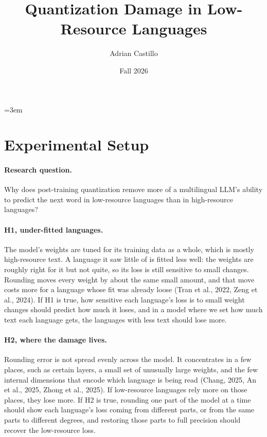 \documentclass[11pt]{article}
\title{Quantization Damage in Low-Resource Languages}
\author{Adrian Castillo}
\date{Fall 2026}
\begin{document}
\emergencystretch=3em

\maketitle

\section{Experimental Setup}

\paragraph{Research question.} Why does post-training quantization remove more of a multilingual LLM's ability to predict the next word in low-resource languages than in high-resource languages?

\paragraph{H1, under-fitted languages.} The model's weights are tuned for its training data as a whole, which is mostly high-resource text. A language it saw little of is fitted less well: the weights are roughly right for it but not quite, so its loss is still sensitive to small changes. Rounding moves every weight by about the same small amount, and that move costs more for a language whose fit was already loose (Tran et al., 2022, Zeng et al., 2024). If H1 is true, how sensitive each language's loss is to small weight changes should predict how much it loses, and in a model where we set how much text each language gets, the languages with less text should lose more.

\paragraph{H2, where the damage lives.} Rounding error is not spread evenly across the model. It concentrates in a few places, such as certain layers, a small set of unusually large weights, and the few internal dimensions that encode which language is being read (Chang, 2025, An et al., 2025, Zhong et al., 2025). If low-resource languages rely more on those places, they lose more. If H2 is true, rounding one part of the model at a time should show each language's loss coming from different parts, or from the same parts to different degrees, and restoring those parts to full precision should recover the low-resource loss.
\end{document}
